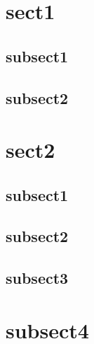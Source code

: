 \section{sect1}
\subsection{subsect1}
\lipsum[1]

\subsection{subsect2}
\lipsum[1]

\section{sect2}
\subsection{subsect1}
\lipsum[1]

\subsection{subsect2}
\lipsum[1]

\subsection{subsect3}
\lipsum[1]

\section{subsect4}
\lipsum[1]